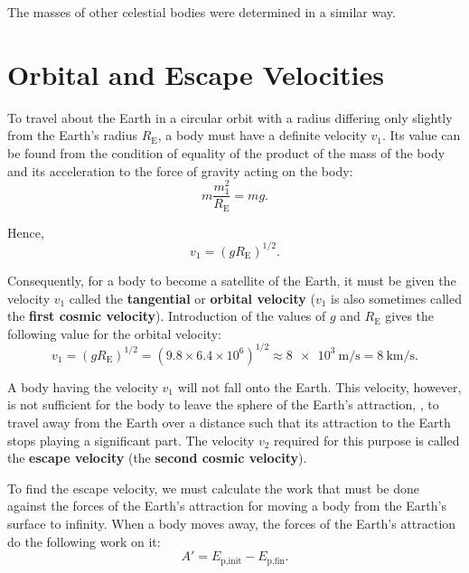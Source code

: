 The masses of other celestial bodies were determined in a similar way.

\section{Orbital and Escape Velocities}\label{sec:6_4}

To travel about the Earth in a circular orbit with a radius differing only slightly from the Earth's radius $R_{\text{E}}$, a body must have a definite velocity $v_1$. Its value can be found from the condition of equality of the product of the mass of the body and its acceleration to the force of gravity acting on the body:
\begin{equation*}
	m\frac{m_1^2}{R_{\text{E}}} = mg.
\end{equation*}

\noindent
Hence,
\begin{equation}\label{eq:6_24}
	v_1 = (gR_{\text{E}})^{1/2}.
\end{equation}

Consequently, for a body to become a satellite of the Earth, it must be given the velocity $v_1$ called the \textbf{tangential} or \textbf{orbital velocity} ($v_1$ is also sometimes called the \textbf{first cosmic velocity}). Introduction of the values of $g$ and $R_{\text{E}}$ gives the following value for the orbital velocity:
\begin{equation*}
	v_1 = (gR_{\text{E}})^{1/2} = (9.8 \times 6.4 \times 10^6)^{1/2} \approx \SI{8e3}{\metre\per\second} = \SI{8}{\kilo\metre\per\second}.
\end{equation*}

A body having the velocity $v_1$ will not fall onto the Earth. This velocity, however, is not sufficient for the body to leave the sphere of the Earth's attraction, \ie, to travel away from the Earth over a distance such that its attraction to the Earth stops playing a significant part. The velocity $v_2$ required for this purpose is called the \textbf{escape velocity} (the \textbf{second cosmic velocity}).

To find the escape velocity, we must calculate the work that must be done against the forces of the Earth's attraction for moving a body from the Earth's surface to infinity. When a body moves away, the forces of the Earth's attraction do the following work on it:
\begin{equation*}
	A' = E_{\text{p,init}} - E_{\text{p,fin}}.
\end{equation*}

